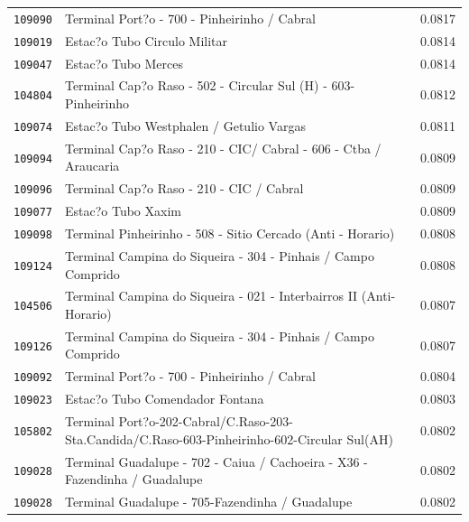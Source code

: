 \begin{table}[htb]
\begin{tabular}{p{1.0cm}p{9.0cm}p{3.0cm} }
           \texttt{109090} &                                                   Terminal Port?o - 700 - Pinheirinho / Cabral  & 0.0817 \\
           \texttt{109019} &                                                                   Estac?o Tubo Circulo Militar  & 0.0814 \\
           \texttt{109047} &                                                                            Estac?o Tubo Merces  & 0.0814 \\
           \texttt{104804} &                                 Terminal Cap?o Raso - 502 - Circular Sul (H) - 603-Pinheirinho  & 0.0812 \\
           \texttt{109074} &                                                       Estac?o Tubo Westphalen / Getulio Vargas  & 0.0811 \\
           \texttt{109094} &                               Terminal Cap?o Raso - 210 - CIC/ Cabral - 606 - Ctba / Araucaria  & 0.0809 \\
           \texttt{109096} &                                                       Terminal Cap?o Raso - 210 - CIC / Cabral  & 0.0809 \\
           \texttt{109077} &                                                                             Estac?o Tubo Xaxim  & 0.0809 \\
           \texttt{109098} &                                    Terminal Pinheirinho - 508 - Sitio Cercado (Anti - Horario)  & 0.0808 \\
           \texttt{109124} &                                  Terminal Campina do Siqueira - 304 - Pinhais / Campo Comprido  & 0.0808 \\
           \texttt{104506} &                            Terminal Campina do Siqueira - 021 - Interbairros II (Anti-Horario)  & 0.0807 \\
           \texttt{109126} &                                  Terminal Campina do Siqueira - 304 - Pinhais / Campo Comprido  & 0.0807 \\
           \texttt{109092} &                                                   Terminal Port?o - 700 - Pinheirinho / Cabral  & 0.0804 \\
           \texttt{109023} &                                                                Estac?o Tubo Comendador Fontana  & 0.0803 \\
           \texttt{105802} &  Terminal Port?o-202-Cabral/C.Raso-203-Sta.Candida/C.Raso-603-Pinheirinho-602-Circular Sul(AH)  & 0.0802 \\
           \texttt{109028} &                    Terminal Guadalupe - 702 - Caiua / Cachoeira - X36 - Fazendinha / Guadalupe  & 0.0802 \\
           \texttt{109028} &                                                Terminal Guadalupe - 705-Fazendinha / Guadalupe  & 0.0802 \\
           \hline  
    \end{tabular}
\end{table}



